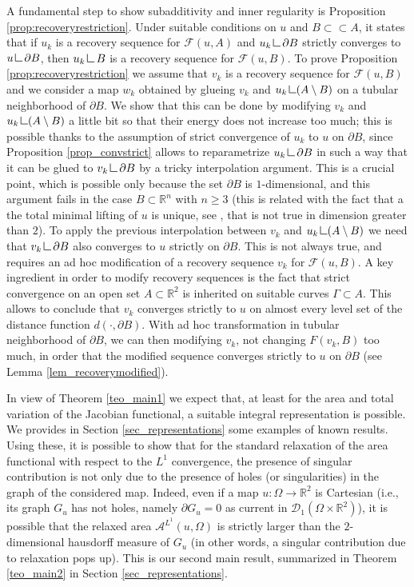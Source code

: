 \documentclass[a4paper,11pt]{article}
\numberwithin{equation}{section}
\newcommand{\Om}{\Omega}
\newcommand{\R}{\mathbb{R}}
\newcommand{\res}      {\mathop{\hbox{\vrule height 7pt width .5pt depth
                        0pt\vrule height .5pt width 6pt depth 0pt}}\nolimits}
\begin{document}
A fundamental step to show subadditivity and inner regularity is Proposition \ref{prop:recoveryrestriction}. Under suitable conditions on $u$ and $B\subset\subset A$, it states that if $u_k$ is a recovery sequence for $\mathcal F(u,A)$ and $u_k\res \partial B$ strictly converges to $u\res \partial B$, then $u_k\res B$ is a recovery sequence for $\mathcal F(u,B)$. To prove Proposition \ref{prop:recoveryrestriction} we assume that $v_k$ is a recovery sequence for $\mathcal F(u,B)$  and we consider a map $w_k$ obtained by glueing $v_k$ and $u_k\res (A\setminus B)$ on a tubular neighborhood of $\partial B$. We show that this can be done by modifying $v_k$ and $u_k\res (A\setminus B)$ a little bit so that their energy does not increase too much; this is possible thanks to the assumption of strict convergence of $u_k$ to $u$ on $\partial B$, since Proposition \ref{prop_convstrict} allows to reparametrize $u_k\res \partial B$ in such a way that it can be glued to $v_k\res \partial B$ by a tricky interpolation argument. This is a crucial point, which is possible only because the set $\partial B$ is $1$-dimensional, and this argument fails in the case $B\subset \R^n$ with $n\geq3$ (this is related with the fact that a the total minimal lifting of $u$ is unique, see \cite{Mucci}, that is not true in dimension greater than $2$). 
To apply the previous interpolation between $v_k$ and $u_k\res (A\setminus B)$ we need that $v_k\res \partial B$ also converges to $u$ strictly on $\partial B$. This is not always true, and requires an ad hoc modification of a recovery sequence $v_k$ for $\mathcal F(u,B)$. 
A key ingredient  in order to modify recovery sequences is the fact that strict convergence on an open set $A\subset\R^2$ is inherited on suitable curves $\Gamma\subset A$. This allows to conclude that $v_k$ converges strictly to $u$ on almost every level set of the distance function $d(\cdot,\partial B)$. With ad hoc transformation in tubular neighborhood of $\partial B$, we can then modifying $v_k$, not changing $F(v_k,B)$ too much, in order that the modified sequence converges strictly to $u$ on $\partial B$ (see Lemma \ref{lem_recoverymodified}).  
 
 
 
In view of Theorem  \ref{teo_main1} we expect that, at least for the area and total variation of the Jacobian functional, a suitable integral representation is possible. We provides in Section \ref{sec_representations} some examples of known results. Using these, it is possible to show that for the standard relaxation of the area functional with respect to the $L^1$ convergence, the presence of singular contribution is not only due to the presence of holes (or singularities) in the graph of the considered map. Indeed, even if a map $u:\Om\rightarrow \R^2$ is Cartesian (i.e., its graph $G_u$ has not holes, namely $\partial G_u=0$ as current in $\mathcal D_1(\Om\times \R^2)$), it is possible that the relaxed area $\mathcal A^{L^1}(u,\Om)$ is strictly larger than the $2$-dimensional hausdorff measure of $G_u$ (in other words, a singular contribution due to relaxation pops up). This is our second main result, summarized in Theorem \ref{teo_main2} in Section \ref{sec_representations}.
\end{document}
